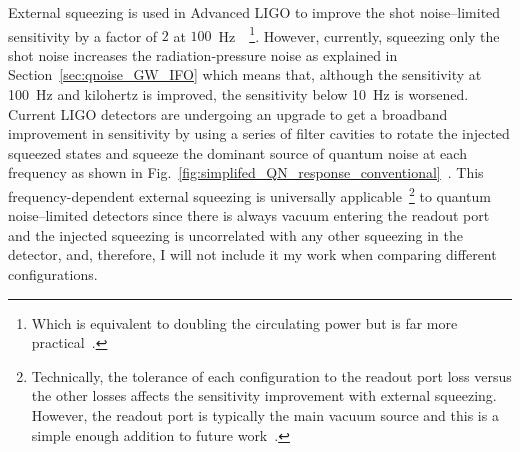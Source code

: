 External squeezing is used in Advanced LIGO to improve the shot noise--limited sensitivity by a factor of $2$ at $100$~Hz~\cite{tseQuantumEnhancedAdvancedLIGO2019}~\footnote{Which is equivalent to doubling the circulating power but is far more practical~\cite{}.}.
However, currently, squeezing only the shot noise increases the radiation-pressure noise as explained in Section~\ref{sec:qnoise_GW_IFO}  which means that, although the sensitivity at 100~Hz and kilohertz is improved, the sensitivity below 10~Hz  is worsened.
Current LIGO detectors are undergoing an upgrade to get a broadband improvement in sensitivity by using a series of filter cavities to rotate the injected squeezed states and squeeze the dominant source of quantum noise at each frequency as shown in Fig.~\ref{fig:simplifed_QN_response_conventional}~\cite{LIGOFilterCavitypaperLeeMcCulleretal}.
This frequency-dependent external squeezing is universally applicable~\footnote{Technically, the tolerance of each configuration to the readout port loss versus the other losses affects the sensitivity improvement with external squeezing. However, the readout port is typically the main vacuum source and this is a simple enough addition to future work~\cite{}.} to quantum noise--limited detectors since there is always vacuum entering the readout port and the injected squeezing is uncorrelated with any other squeezing in the detector, and, therefore, I will not include it my work when comparing different configurations. %


